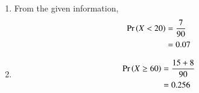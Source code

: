 \begin{enumerate}
\item From the given information, 
\begin{align}
\Pr\left(X < 20\right) &= \frac{7}{90}
	\\
	&=0.07
\end{align}
\item 
\begin{align}
\Pr\left(X \ge 60\right) &= \frac{15 + 8}{90}
\\
&= 0.256
\end{align}
\end{enumerate}
